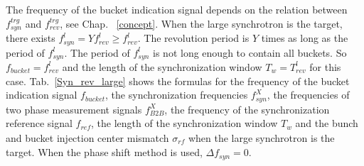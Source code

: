 The frequency of the bucket indication signal depends on the relation between $f_{\mathit{syn}}^{\mathit{trg}}$ and $f_{\mathit{rev}}^{\mathit{trg}}$, see Chap. ~\ref{concept}.
%
When the large synchrotron is the target, there exists $f_{\mathit{syn}}^{l}=Yf_{\mathit{rev}}^{l}\ge f_{\mathit{rev}}^{l}$. The revolution period is $Y$ times as long as the period of $f_{\mathit{syn}}^{l}$. The period of $f_{\mathit{syn}}^{l}$ is not long enough to contain all buckets. So $f_\mathit{bucket}=f_{\mathit{rev}}^{l}$ and the length of the synchronization window $T_w=T_{\mathit{rev}}^{l}$ for this case. Tab.~\ref{Syn_rev_large} shows the formulas for the frequency of the bucket indication signal $f_\mathit{bucket}$, the synchronization frequencies $f_\mathit{syn}^\mathit{X}$, the frequencies of two phase measurement signals $f_\mathit{B2B}^\mathit{X}$, the frequency of the synchronization reference signal $f_\mathit{ref}$, the length of the synchronization window $T_w$ and the bunch and bucket injection center mismatch $\sigma_\mathit{rf}$ when the large synchrotron is the target. When the phase shift method is used, $\Delta f_\mathit{syn}=0$.

